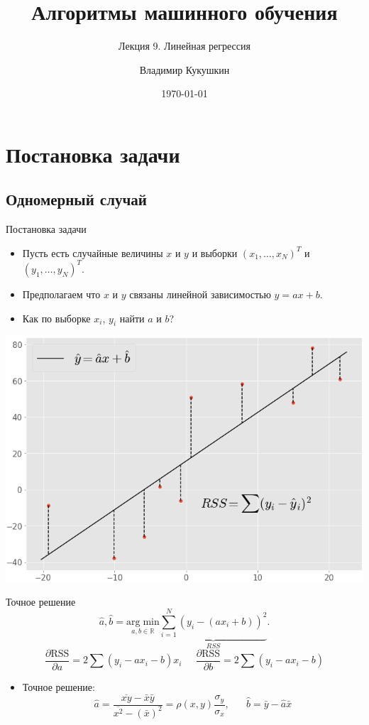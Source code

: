 \documentclass[9pt]{beamer}
\title{Алгоритмы машинного обучения}
\subtitle{Лекция 9. Линейная регрессия}
\author{Владимир Кукушкин}
\institute{СПбГЭУ - 24.02.2020}
\date{\today}
\begin{document}
\titlepage

\section{Постановка задачи}
\subsection{Одномерный случай}

\begin{frame}{Постановка задачи}
\begin{itemize}
    \item Пусть есть случайные величины $x$ и $y$ и выборки $(x_1, \ldots, x_N)^T$ и $(y_1, \ldots, y_N)^T$. 
    \item Предполагаем что $x$ и $y$ связаны линейной зависимостью $y=ax+b$.
    \item Как по выборке $x_i$, $y_i$ найти $a$ и $b$?
\end{itemize}
\begin{center}
    \includegraphics[height=0.5\textheight]{img/linear_regression_2d.png}
\end{center}
\end{frame}

\begin{frame}{Точное решение}
    $$\hat a, \hat b = \underset{a, b\in \mathbb{R}}{\mathrm{arg\;min}}\underbrace{\sum_{i=1}^N (y_i - (ax_i + b))^2}_{RSS}.$$
    $$\frac{\partial \text{RSS}}{\partial a} = 2\sum (y_i - ax_i - b)x_i\;\;\;\;\;\frac{\partial \text{RSS}}{\partial b} = 2\sum (y_i - ax_i - b)$$
\begin{itemize}
    \item Точное решение:
    $$\hat a = \frac{\overline{xy} - \bar x\bar y}{\overline{x^2} - (\bar x)^2} = \rho(x, y)\frac{\sigma_y}{\sigma_x} , \;\;\;\;\;\; \hat b = \bar y - \hat a \bar x$$
\end{itemize}
\end{frame}
\end{document}
